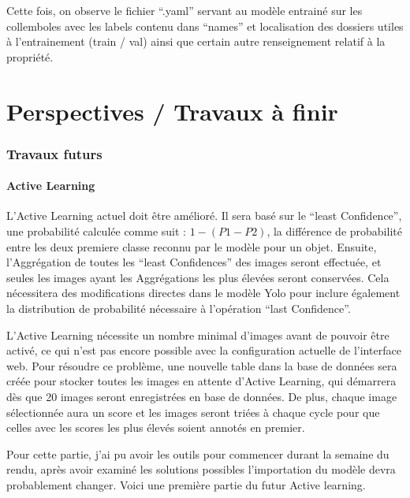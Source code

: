 \documentclass[
  10pt,
]{article}
\begin{document}
Cette fois, on observe le fichier ``.yaml'' servant au modèle entrainé
sur les collemboles avec les labels contenu dans ``names'' et
localisation des dossiers utiles à l'entrainement (train / val) ainsi
que certain autre renseignement relatif à la propriété.

\newpage

\section{Perspectives / Travaux à
finir}\label{perspectives-travaux-uxe0-finir}

\subsubsection{Travaux futurs}\label{travaux-futurs}

\paragraph{Active Learning}\label{active-learning-1}

L'Active Learning actuel doit être amélioré. Il sera basé sur le ``least
Confidence'', une probabilité calculée comme suit : \(1 - (P1 - P2)\),
la différence de probabilité entre les deux premiere classe reconnu par
le modèle pour un objet. Ensuite, l'Aggrégation de toutes les ``least
Confidences'' des images seront effectuée, et seules les images ayant
les Aggrégations les plus élevées seront conservées. Cela nécessitera
des modifications directes dans le modèle Yolo pour inclure également la
distribution de probabilité nécessaire à l'opération ``last
Confidence''.

L'Active Learning nécessite un nombre minimal d'images avant de pouvoir
être activé, ce qui n'est pas encore possible avec la configuration
actuelle de l'interface web. Pour résoudre ce problème, une nouvelle
table dans la base de données sera créée pour stocker toutes les images
en attente d'Active Learning, qui démarrera dès que 20 images seront
enregistrées en base de données. De plus, chaque image sélectionnée aura
un score et les images seront triées à chaque cycle pour que celles avec
les scores les plus élevés soient annotés en premier.

Pour cette partie, j'ai pu avoir les outils pour commencer durant la
semaine du rendu, après avoir examiné les solutions possibles
l'importation du modèle devra probablement changer. Voici une première
partie du futur Active learning.
\end{document}
